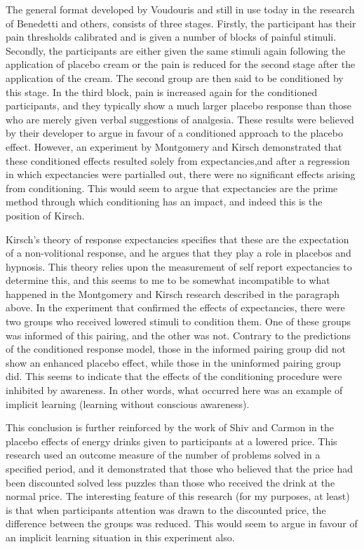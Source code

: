 The general format developed by Voudouris and still in use today in the research of Benedetti \cite{Benedetti2006c} and others, consists of three stages. Firstly, the participant has their pain thresholds calibrated and is given a number of blocks of painful stimuli. Secondly, the participants are either given the same stimuli again following the application of placebo cream or the pain is reduced for the second stage after the application of the cream. The second group are then said to be conditioned by this stage. In the third block, pain is increased again for the conditioned participants, and they typically show a much larger placebo response than those who are merely given verbal suggestions of analgesia.  These results were believed by their developer to argue in favour of a conditioned approach to the placebo effect. However, an experiment by Montgomery and Kirsch \cite{Montgomery1997} demonstrated that these conditioned effects resulted solely from expectancies,and after a regression in which expectancies were partialled out, there were no significant effects arising from conditioning. This would seem to argue that expectancies are the prime method through which conditioning has an impact, and indeed this is the position of Kirsch. 

Kirsch's \cite{Kirsch1985,Kirsch1997} theory of response expectancies specifies that these are the expectation of a non-volitional response, and he argues that they play a role in placebos and hypnosis. This theory  relies upon the measurement of self report expectancies to determine this, and this seems to me to be somewhat incompatible to what happened in the Montgomery and Kirsch research described in the paragraph above. In the experiment that confirmed the effects of expectancies, there were two groups who received lowered stimuli to condition them. One of these groups was informed of this pairing, and the other was not. Contrary to the predictions of the conditioned response model, those in the informed pairing group did not show an enhanced placebo effect, while those in the uninformed pairing group did. This seems to indicate that the effects of the conditioning procedure were inhibited by awareness. In other words, what occurred here was an example of implicit learning (learning without conscious awareness).

This conclusion is further reinforced by the work of Shiv and Carmon \cite{Shiv2005a} in the placebo effects of energy drinks given to participants at a lowered price. This research used an outcome measure of the number of problems solved in a specified period, and it demonstrated that those who believed that the price had been discounted solved less puzzles than those who received the drink at the normal price. The interesting feature of this research (for my purposes, at least) is that when participants attention was drawn to the discounted price, the difference between the groups was reduced. This would seem to argue in favour of an implicit learning situation in this experiment also. 

